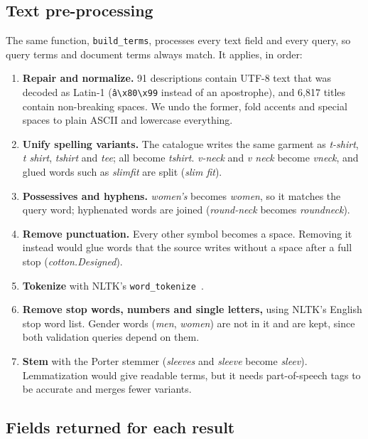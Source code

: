 \documentclass[11pt,a4paper]{article}
\begin{document}
\subsection{Text pre-processing}

The same function, \texttt{build\_terms}, processes every text field and every
query, so query terms and document terms always match. It applies, in order:

\begin{enumerate}
  \item \textbf{Repair and normalize.} 91 descriptions contain UTF-8 text that was
    decoded as Latin-1 (\texttt{â\textbackslash x80\textbackslash x99} instead of an
    apostrophe), and 6{,}817 titles contain non-breaking spaces. We undo the former,
    fold accents and special spaces to plain ASCII and lowercase everything.
  \item \textbf{Unify spelling variants.} The catalogue writes the same garment as
    \emph{t-shirt}, \emph{t shirt}, \emph{tshirt} and \emph{tee}; all become
    \emph{tshirt}. \emph{v-neck} and \emph{v neck} become \emph{vneck}, and glued
    words such as \emph{slimfit} are split (\emph{slim fit}).
  \item \textbf{Possessives and hyphens.} \emph{women's} becomes \emph{women}, so it
    matches the query word; hyphenated words are joined (\emph{round-neck} becomes
    \emph{roundneck}).
  \item \textbf{Remove punctuation.} Every other symbol becomes a space. Removing it
    instead would glue words that the source writes without a space after a full
    stop (\emph{cotton.Designed}).
  \item \textbf{Tokenize} with NLTK's \texttt{word\_tokenize}~\cite{bird2009nltk}.
  \item \textbf{Remove stop words, numbers and single letters,} using NLTK's English
    stop word list. Gender words (\emph{men}, \emph{women}) are not in it and are kept,
    since both validation queries depend on them.
  \item \textbf{Stem} with the Porter stemmer (\emph{sleeves} and \emph{sleeve} become
    \emph{sleev}). Lemmatization would give readable terms, but it needs
    part-of-speech tags to be accurate and merges fewer variants.
\end{enumerate}

\subsection{Fields returned for each result}
\end{document}
